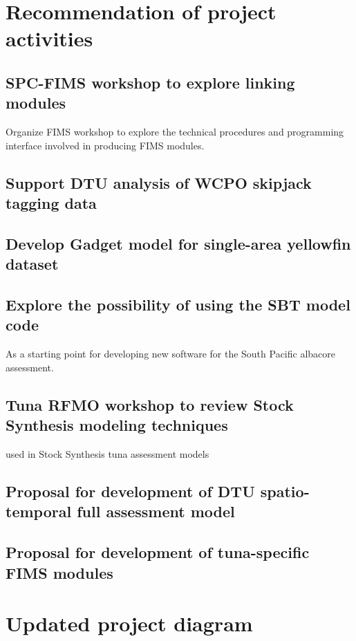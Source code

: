 \documentclass{SCreport}
\begin{document}
\section{Recommendation of project activities}

\subsection{SPC-FIMS workshop to explore linking modules}
\label{sec:fims-workshop}

Organize FIMS workshop to explore the technical procedures and programming
interface involved in producing FIMS modules.

\subsection{Support DTU analysis of WCPO skipjack tagging data}

\subsection{Develop Gadget model for single-area yellowfin dataset}

\subsection{Explore the possibility of using the SBT model code}

As a starting point for developing new software for the South Pacific albacore
assessment.

\subsection{Tuna RFMO workshop to review Stock Synthesis modeling techniques}

used in Stock Synthesis tuna assessment models

\subsection{Proposal for development of DTU spatio-temporal full assessment
  model}

\subsection{Proposal for development of tuna-specific FIMS modules}

\section{Updated project diagram}
\end{document}
